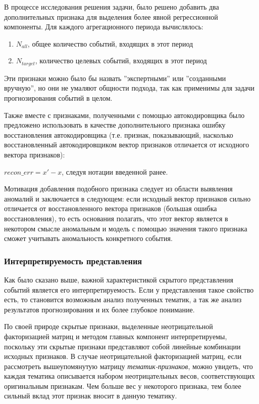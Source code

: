 В процессе исследования решения задачи, было решено добавить два дополнительных признака для выделения более явной регрессионной компоненты. Для каждого агрегационного периода вычислялось:
\begin{enumerate}
   \item $N_{all}$, общее количество событий, входящих в этот период
   \item $N_{target}$, количество целевых событий, входящих в этот период
\end{enumerate}

Эти признаки можно было бы назвать ''экспертными'' или ''созданными вручную'', но они не умаляют общности подхода, так как применимы для задачи прогнозирования событий в целом.

Также вместе с признаками, полученными с помощью автокодировщика было предложено использовать в качестве дополнительного признака ошибку восстановления автокодировщика (т.е. признак, показывающий, насколько восстановленный автокодировщиком вектор признаков отличается от исходного вектора признаков):

$recon\_err = x' - x$, следуя нотации введенной ранее.

Мотивация добавления подобного признака следует из области выявления аномалий \cite{anomaly_detection_ae} и заключается в следующем: если исходный вектор признаков сильно отличается от восстановленного вектора признаков (большая ошибка восстановления), то есть основания полагать, что этот вектор является в некотором смысле аномальным и модель с помощью значения такого признака сможет учитывать аномальность конкретного события.

\subsubsection{Интерпретируемость представления}
\label{subsub:interp}
Как было сказано выше, важной характеристикой скрытого представления событий является его интерпретируемость. Если у представления такое свойство есть, то становится возможным анализ полученных тематик, а так же анализ результатов прогнозирования и их более глубокое понимание.

По своей природе скрытые признаки, выделенные неотрицательной факторизацией матриц и методом главных компонент интерпретируемы, поскольку эти скрытые признаки представляют собой линейные комбинации исходных признаков. В случае неотрицательной факторизацией матриц, если рассмотреть вышеупомянутую матрицу \textit{тематик-признаков}, можно увидеть, что каждая тематика описывается набором неотрицательных весов, соответствующих оригинальным признакам. Чем больше вес у некоторого признака, тем более сильный вклад этот признак вносит в данную тематику. 


